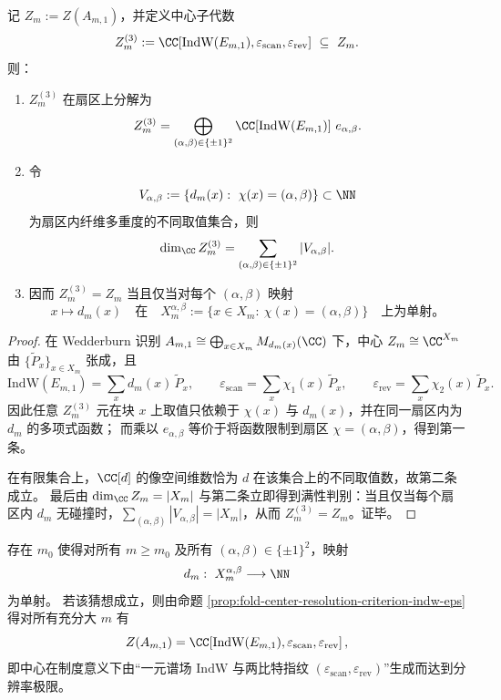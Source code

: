 \begin{proposition}\label{prop:fold-center-resolution-criterion-indw-eps}
记 \(Z_m:=Z(A_{m,1})\)，并定义中心子代数
\[
Z_m^{(3)}:=\CC\!\left[\mathrm{IndW}(E_{m,1}),\varepsilon_{\mathrm{scan}},\varepsilon_{\mathrm{rev}}\right]\ \subseteq\ Z_m.
\]
则：
\begin{enumerate}
\normalfont
  \item \(Z_m^{(3)}\) 在扇区上分解为
  \[
  Z_m^{(3)}
  =
  \bigoplus_{(\alpha,\beta)\in\{\pm1\}^2}\CC\!\left[\mathrm{IndW}(E_{m,1})\right]\,e_{\alpha,\beta}.
  \]
  \item 令
  \[
  V_{\alpha,\beta}:=\{d_m(x):\ \chi(x)=(\alpha,\beta)\}\subset\NN
  \]
  为扇区内纤维多重度的不同取值集合，则
  \[
  \dim_{\CC}Z_m^{(3)}=\sum_{(\alpha,\beta)\in\{\pm1\}^2}|V_{\alpha,\beta}|.
  \]
  \item 因而 \(Z_m^{(3)}=Z_m\) 当且仅当对每个 \((\alpha,\beta)\) 映射
  \[
  x\longmapsto d_m(x)
  \quad\text{在}\quad
  X_m^{\alpha,\beta}:=\{x\in X_m:\ \chi(x)=(\alpha,\beta)\}
  \quad\text{上为单射。}
  \]
\end{enumerate}
\end{proposition}
\begin{proof}
在 Wedderburn 识别 \(A_{m,1}\cong\bigoplus_{x\in X_m}M_{d_m(x)}(\CC)\) 下，中心 \(Z_m\cong\CC^{X_m}\) 由 \(\{\widetilde P_x\}_{x\in X_m}\) 张成，且
\[
\mathrm{IndW}(E_{m,1})=\sum_x d_m(x)\,\widetilde P_x,\qquad
\varepsilon_{\mathrm{scan}}=\sum_x \chi_1(x)\,\widetilde P_x,\qquad
\varepsilon_{\mathrm{rev}}=\sum_x \chi_2(x)\,\widetilde P_x.
\]
因此任意 \(Z_m^{(3)}\) 元在块 \(x\) 上取值只依赖于 \(\chi(x)\) 与 \(d_m(x)\)，并在同一扇区内为 \(d_m\) 的多项式函数；
而乘以 \(e_{\alpha,\beta}\) 等价于将函数限制到扇区 \(\chi=(\alpha,\beta)\)，得到第一条。
\par
在有限集合上，\(\CC[d]\) 的像空间维数恰为 \(d\) 在该集合上的不同取值数，故第二条成立。
最后由 \(\dim_{\CC}Z_m=|X_m|\) 与第二条立即得到满性判别：当且仅当每个扇区内 \(d_m\) 无碰撞时，\(\sum_{(\alpha,\beta)}|V_{\alpha,\beta}|=|X_m|\)，从而 \(Z_m^{(3)}=Z_m\)。证毕。
\end{proof}

\begin{conjecture}[扇区内纤维多重度的最终单谱性]\label{conj:fold-sectorwise-eventual-simple-spectrum}
存在 \(m_0\) 使得对所有 \(m\ge m_0\) 及所有 \((\alpha,\beta)\in\{\pm1\}^2\)，映射
\[
d_m:\ X_m^{\alpha,\beta}\longrightarrow \NN
\]
为单射。
若该猜想成立，则由命题 \ref{prop:fold-center-resolution-criterion-indw-eps} 得对所有充分大 \(m\) 有
\[
Z(A_{m,1})=\CC\!\left[\mathrm{IndW}(E_{m,1}),\varepsilon_{\mathrm{scan}},\varepsilon_{\mathrm{rev}}\right],
\]
即中心在制度意义下由“一元谱场 \(\mathrm{IndW}\) 与两比特指纹 \((\varepsilon_{\mathrm{scan}},\varepsilon_{\mathrm{rev}})\)”生成而达到分辨率极限。
\end{conjecture}

